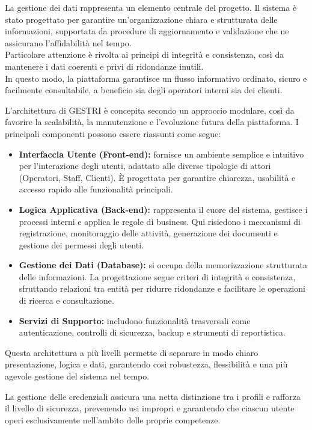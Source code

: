 \documentclass[a4paper]{report}
\begin{document}
La gestione dei dati rappresenta un elemento centrale del progetto. 
Il sistema è stato progettato per garantire un’organizzazione chiara e strutturata delle informazioni, supportata da procedure di aggiornamento e validazione che ne assicurano l’affidabilità nel tempo.
\\
Particolare attenzione è rivolta ai principi di integrità e consistenza, così da mantenere i dati coerenti e privi di ridondanze inutili.
\\
In questo modo, la piattaforma garantisce un flusso informativo ordinato, sicuro e facilmente consultabile, a beneficio sia degli operatori interni sia dei clienti.	

L’architettura di GESTRI è concepita secondo un approccio modulare, così da favorire la scalabilità, la manutenzione e l’evoluzione futura della piattaforma. I principali componenti possono essere riassunti come segue:
\begin{itemize}
    \item \textbf{Interfaccia Utente (Front-end):} fornisce un ambiente semplice e intuitivo per l’interazione degli utenti, adattato alle diverse tipologie di attori (Operatori, Staff, Clienti). 
    È progettata per garantire chiarezza, usabilità e accesso rapido alle funzionalità principali.
    \item \textbf{Logica Applicativa (Back-end):} rappresenta il cuore del sistema, gestisce i processi interni e applica le regole di business. 
    Qui risiedono i meccanismi di registrazione, monitoraggio delle attività, generazione dei documenti e gestione dei permessi degli utenti.
    \item \textbf{Gestione dei Dati (Database):} si occupa della memorizzazione strutturata delle informazioni. 
    La progettazione segue criteri di integrità e consistenza, sfruttando relazioni tra entità per ridurre ridondanze e facilitare le operazioni di ricerca e consultazione.
    \item \textbf{Servizi di Supporto:} includono funzionalità trasversali come autenticazione, controlli di sicurezza, backup e strumenti di reportistica.
\end{itemize}
Questa architettura a più livelli permette di separare in modo chiaro presentazione, logica e dati, garantendo così robustezza, flessibilità e una più agevole gestione del sistema nel tempo.

La gestione delle credenziali assicura una netta distinzione tra i profili e rafforza il livello di sicurezza, prevenendo usi impropri e garantendo che ciascun utente operi esclusivamente nell’ambito delle proprie competenze.
\end{document}
